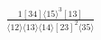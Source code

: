\documentclass[varwidth, border=5pt]{standalone}
\begin{document}
\begin{my}
$\begin{gathered}
\scriptscriptstyle\frac{1[34]⟨15⟩^3[13]}{⟨12⟩⟨13⟩⟨14⟩[23]^2⟨35⟩}
\end{gathered}$
\end{my}
\end{document}
